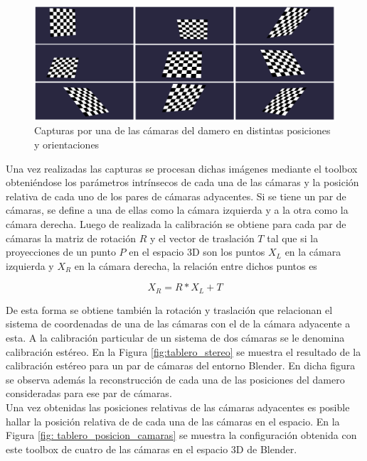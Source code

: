 \begin{figure}[ht!]
\begin{center}
\includegraphics[scale=0.08]{img/calibracion/tablero_posiciones.png}
\end{center}
\caption{Capturas por una de las cámaras del damero en distintas posiciones y orientaciones }
\label{fig: tablero_posiciones}
\end{figure}


Una vez realizadas las capturas se procesan dichas imágenes mediante el toolbox obteniéndose los parámetros intrínsecos de cada una de las cámaras y la posición relativa de cada uno de los pares de cámaras adyacentes. Si se tiene un par de cámaras, se define a una de ellas como la cámara izquierda y a la otra como la cámara derecha. Luego de realizada la calibración se obtiene para cada par de cámaras la matriz de rotación $R$ y el vector de traslación $T$ tal que si la proyecciones de un punto $P$ en el espacio 3D son los puntos $X_L$ en la cámara izquierda y $X_R$ en la cámara derecha, la relación entre dichos puntos es

\[ X_R = R * X_L + T\]

De esta forma se obtiene también la rotación y traslación que relacionan el sistema de coordenadas de una de las cámaras con el de la cámara adyacente a esta. A la calibración particular de un sistema de dos cámaras se le denomina calibración estéreo. En la Figura \ref{fig:tablero_stereo} se muestra el resultado de la calibración estéreo para un par de cámaras del entorno Blender. En dicha figura se observa además la reconstrucción de cada una de las posiciones del damero consideradas para ese par de cámaras.\\

Una vez obtenidas las posiciones relativas de las cámaras adyacentes es posible hallar la posición relativa de de cada una de  las cámaras en el espacio. En la Figura  \ref{fig: tablero_posicion_camaras} se muestra la configuración obtenida con este toolbox de cuatro de las cámaras en el espacio 3D de Blender.

